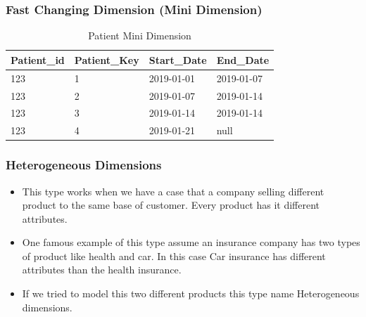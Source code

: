 \begin{frame}
	\frametitle{Fast Changing Dimension (Mini Dimension)}

\begin{table}
	\begin{adjustbox}{max width=.7\textwidth}
		\begin{tabular}{| l | l | l | l |}
			\hline
			Patient\_id & Patient\_Key & Start\_Date & End\_Date\\
			\hline
			\hline		
			123 & 1   & 2019-01-01 & 2019-01-07\\
			123 & 2   & 2019-01-07 & 2019-01-14\\
			123 & 3   & 2019-01-14 & 2019-01-14\\
			123 & 4   & 2019-01-21 & null\\
			\hline
		\end{tabular}
	\end{adjustbox}
	\caption{Patient Mini Dimension}
\end{table}

\end{frame}
\begin{frame}
\frametitle{Heterogeneous Dimensions}
\begin{itemize}[<+->]
	
	\item This type works when we have a case that a company selling different product to the same base of customer. Every product has it different attributes. 
	\item One famous example of this type assume an insurance company has two types of product like health and car. In this case Car insurance has different attributes than the health insurance.
	\item If we tried to model this two different products this type name Heterogeneous dimensions. 
\end{itemize}
\end{frame}
